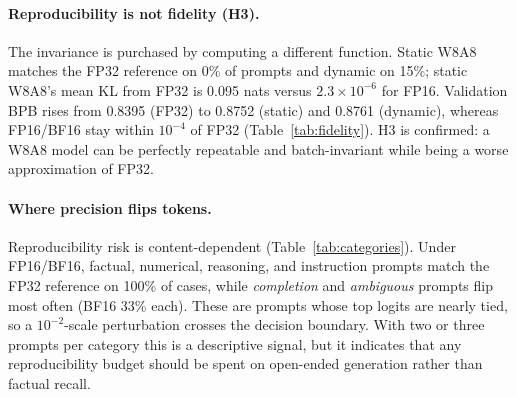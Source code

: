 \documentclass[wcp]{jmlr}
\begin{document}
\paragraph{Reproducibility is not fidelity (H3).} The invariance is purchased by
computing a different function. Static W8A8 matches the FP32 reference on 0\% of
prompts and dynamic on 15\%; static W8A8's mean KL from FP32 is 0.095 nats versus
$2.3\times10^{-6}$ for FP16. Validation BPB rises from 0.8395 (FP32) to 0.8752
(static) and 0.8761 (dynamic), whereas FP16/BF16 stay within $10^{-4}$ of FP32
(Table~\ref{tab:fidelity}). H3 is confirmed: a W8A8 model can be perfectly
repeatable and batch-invariant while being a worse approximation of FP32.

\begin{table}[t]
\centering
\caption{Fidelity ablation: held-out validation BPB over 2.1M tokens.}
\label{tab:fidelity}
\footnotesize

\end{table}

\paragraph{Where precision flips tokens.} Reproducibility risk is content-dependent
(Table~\ref{tab:categories}). Under FP16/BF16, factual, numerical, reasoning, and
instruction prompts match the FP32 reference on 100\% of cases, while
\emph{completion} and \emph{ambiguous} prompts flip most often (BF16 33\% each).
These are prompts whose top logits are nearly tied, so a $10^{-2}$-scale
perturbation crosses the decision boundary. With two or three prompts per category this is
a descriptive signal, but it indicates that any reproducibility budget should be
spent on open-ended generation rather than factual recall.

\begin{table}[t]
\centering
\caption{Per-category reference-match rate (batch 1). Lower means the precision
flips more tokens relative to FP32.}
\label{tab:categories}
\footnotesize

\end{table}
\end{document}
